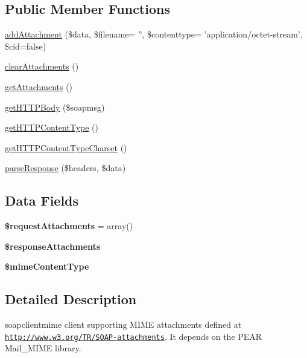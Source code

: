 \subsection*{Public Member Functions}
\begin{DoxyCompactItemize}
\item 
\hyperlink{classsoapclientmime_a05ac1d60ed38ac1db78295337c99eb86}{add\-Attachment} (\$data, \$filename= '', \$contenttype= 'application/octet-\/stream', \$cid=false)
\item 
\hyperlink{classsoapclientmime_a2b4d4199414b58bc4db009cb17ad8e3b}{clear\-Attachments} ()
\item 
\hyperlink{classsoapclientmime_aa91862c4e237ee5b53083f41633babb6}{get\-Attachments} ()
\item 
\hyperlink{classsoapclientmime_ab1e22b0858bdbe61d2d711ff442c0e78}{get\-H\-T\-T\-P\-Body} (\$soapmsg)
\item 
\hyperlink{classsoapclientmime_a2bed19ef2d537dee244535339cd6026a}{get\-H\-T\-T\-P\-Content\-Type} ()
\item 
\hyperlink{classsoapclientmime_a9051db33a9b7e50315d9222ef1c52ce9}{get\-H\-T\-T\-P\-Content\-Type\-Charset} ()
\item 
\hyperlink{classsoapclientmime_aca1ed2155629bfc242ddea3636ac24c1}{parse\-Response} (\$headers, \$data)
\end{DoxyCompactItemize}
\subsection*{Data Fields}
\begin{DoxyCompactItemize}
\item 
\hypertarget{classsoapclientmime_ac58af5d0476b202790c63410360c4696}{{\bfseries \$request\-Attachments} = array()}\label{classsoapclientmime_ac58af5d0476b202790c63410360c4696}

\item 
\hypertarget{classsoapclientmime_a065527a5618c8bb7597a79b33b410a6e}{{\bfseries \$response\-Attachments}}\label{classsoapclientmime_a065527a5618c8bb7597a79b33b410a6e}

\item 
\hypertarget{classsoapclientmime_afca41a43fc6c89107faf7c34a5dedb32}{{\bfseries \$mime\-Content\-Type}}\label{classsoapclientmime_afca41a43fc6c89107faf7c34a5dedb32}

\end{DoxyCompactItemize}


\subsection{Detailed Description}
soapclientmime client supporting M\-I\-M\-E attachments defined at \href{http://www.w3.org/TR/SOAP-attachments}{\tt http\-://www.\-w3.\-org/\-T\-R/\-S\-O\-A\-P-\/attachments}. It depends on the P\-E\-A\-R Mail\-\_\-\-M\-I\-M\-E library.

